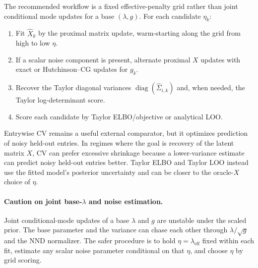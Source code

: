 \documentclass[11pt]{article}
\begin{document}
The recommended workflow is a fixed effective-penalty grid rather than joint
conditional mode updates for a base $(\lambda,g)$.  For each candidate
$\eta_k$:
\begin{enumerate}
    \item Fit $\hat X_k$ by the proximal matrix update, warm-starting along the
          grid from high to low $\eta$.
    \item If a scalar noise component is present, alternate proximal $X$ updates
          with exact or Hutchinson--CG updates for $g_k$.
    \item Recover the Taylor diagonal variances
          $\operatorname{diag}(\hat\Sigma_{i,k})$ and, when needed, the
          Taylor log-determinant score.
    \item Score each candidate by Taylor ELBO/objective or analytical LOO.
\end{enumerate}

Entrywise CV remains a useful external comparator, but it optimizes prediction
of noisy held-out entries.  In regimes where the goal is recovery of the latent
matrix $X$, CV can prefer excessive shrinkage because a lower-variance estimate
can predict noisy held-out entries better.  Taylor ELBO and Taylor LOO instead
use the fitted model's posterior uncertainty and can be closer to the
oracle-$X$ choice of $\eta$.

\paragraph{Caution on joint base-\texorpdfstring{$\lambda$}{lambda} and noise estimation.}
Joint conditional-mode updates of a base $\lambda$ and $g$ are unstable under
the scaled prior.  The base parameter and the variance can chase each other
through $\lambda/\sqrt{g}$ and the NND normalizer.  The safer procedure is to
hold $\eta=\lambda_{\mathrm{eff}}$ fixed within each fit, estimate any scalar
noise parameter conditional on that $\eta$, and choose $\eta$ by grid scoring.
\end{document}
